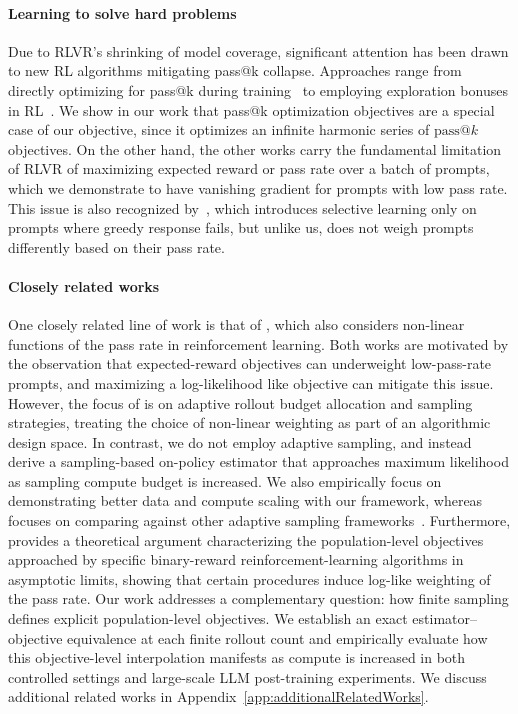 \documentclass[10pt]{article} %
\begin{document}
\paragraph{Learning to solve hard problems} Due to RLVR's shrinking of model coverage, significant attention has been drawn to new RL algorithms mitigating pass@k collapse. Approaches range from directly optimizing for pass@k during training~\citep{walder2025passkpolicyoptimizationsolving,tang2025optimizinglanguagemodelsinference} to employing exploration bonuses in RL~\citep{song2025outcomebasedexplorationllmreasoning,tuyls2025representationbasedexplorationlanguagemodels}. We show in our work that pass@k optimization objectives are a special case of our objective, since it optimizes an infinite harmonic series of $\mathrm{pass}@k$ objectives.  On the other hand, the other works carry the fundamental limitation of RLVR of maximizing expected reward or pass rate over a batch of prompts, which we demonstrate to have vanishing gradient for prompts with low pass rate. This issue is also recognized by~\citet{nguyen2025reasoningboundaryparadoxreinforcement}, which introduces selective learning only on prompts where greedy response fails, but unlike us, does not weigh prompts differently based on their pass rate.

\paragraph{Closely related works}
One closely related line of work is that of \citet{xiong2025reinforceadaadaptivesamplingframework}, which also considers non-linear functions of the pass rate in reinforcement learning. Both works are motivated by the observation that expected-reward objectives can underweight low-pass-rate prompts, and maximizing a log-likelihood like objective can mitigate this issue. However, the focus of \citet{xiong2025reinforceadaadaptivesamplingframework} is on adaptive rollout budget allocation and sampling strategies, treating the choice of non-linear weighting as part of an algorithmic design space. In contrast, we do not employ adaptive sampling, and instead derive a sampling-based on-policy estimator that approaches maximum likelihood as sampling compute budget is increased. We also empirically focus on demonstrating better data and compute scaling with our framework, whereas~\citet{xiong2025reinforceadaadaptivesamplingframework} focuses on comparing against other adaptive sampling frameworks~\citep{yu2025dapoopensourcellmreinforcement}. Furthermore, \citet{davis2025objectivereasoningreinforcementlearning} provides a theoretical argument characterizing the population-level objectives approached by specific binary-reward reinforcement-learning algorithms in asymptotic limits, showing that certain procedures induce log-like weighting of the pass rate. Our work addresses a complementary question: how finite sampling defines explicit population-level objectives. We establish an exact estimator–objective equivalence at each finite rollout count and empirically evaluate how this objective-level interpolation manifests as compute is increased in both controlled settings and large-scale LLM post-training experiments. We discuss additional related works in Appendix~\ref{app:additionalRelatedWorks}.
\end{document}
